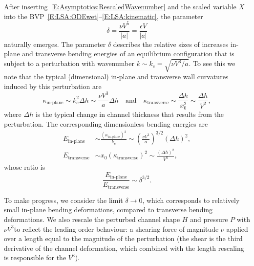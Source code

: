 \documentclass{jfm}
\begin{document}
After inserting~\eqref{E:Asymptotics:RescaledWavenumber} and the scaled variable $X$ into the BVP~\eqref{E:LSA:ODEwet}--\eqref{E:LSA:kinematic}, the parameter
\begin{equation}\label{E:Asymptotics:}
\delta= \frac{\nu V^5}{|a|} = \frac{\epsilon V }{|a|}
\end{equation}
naturally emerges. The parameter $\delta$ describes the relative sizes of increases in-plane and transverse bending energies of an equilibrium configuration that is subject to a perturbation with wavenumber $k \sim k_c = \sqrt{\nu V^3 /a}$. To see this we note that the typical (dimensional) in-plane and transverse wall curvatures induced by this perturbation are
\begin{equation}
\kappa_{\text{in-plane}} \sim k_c^2 \Delta h \sim \frac{\nu V^3}{a} \Delta h \quad \text{and}\quad \kappa_{\text{transverse}} \sim \frac{\Delta h}{x_0^2} \sim  \frac{\Delta h}{V^2},
\end{equation}
where $\Delta h$ is the typical change in channel thickness that results from the perturbation. The corresponding dimensionless bending energies are
\begin{align}
E_{\text{in-plane}} &\sim \frac{\left(\kappa_{\text{in-plane}}\right)^2}{k_c} \sim \left( \frac{\nu V^3}{a}\right)^{3/2}(\Delta h)^2,\\ 
E_{\text{transverse}} &\sim x_0 \left(\kappa_{\text{transverse}}\right)^2 \sim \frac{(\Delta h)^2}{V^3},
\end{align}
whose ratio is
\begin{equation}
\frac{E_{\text{in-plane}}}{ E_{\text{transverse}}}
\sim \delta^{3/2}.
\end{equation}

To make progress, we consider the limit $\delta \to 0$, which corresponds to relatively small in-plane bending deformations, compared to transverse bending deformations.  We  also  rescale  the  perturbed  channel  shape $H$ and  pressure $P$ with $\nu V^3 $to  reflect the leading order behaviour: a shearing force of magnitude $\nu$ applied over a length equal to  the  magnitude  of  the  perturbation  (the  shear  is  the  third  derivative  of  the  channel deformation, which combined with the length rescaling is responsible for the $V^3$).
\end{document}

